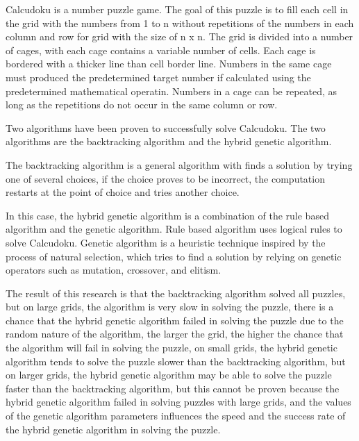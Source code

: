 \abstrakENG
{Calcudoku is a number puzzle game. The goal of this puzzle is to fill each cell in the grid with the numbers from 1 to n without repetitions of the numbers in each column and row for grid with the size of n x n. The grid is divided into a number of cages, with each cage contains a variable number of cells. Each cage is bordered with a thicker line than cell border line. Numbers in the same cage must produced the predetermined target number if calculated using the predetermined mathematical operatin. Numbers in a cage can be repeated, as long as the repetitions do not occur in the same column or row.

Two algorithms have been proven to successfully solve Calcudoku. The two algorithms are the backtracking algorithm and the hybrid genetic algorithm.

The backtracking algorithm is a general algorithm with finds a solution by trying one of several choices, if the choice proves to be incorrect, the computation restarts at the point of choice and tries another choice.

In this case, the hybrid genetic algorithm is a combination of the rule based algorithm and the genetic algorithm. Rule based algorithm uses logical rules to solve Calcudoku. Genetic algorithm is a heuristic technique inspired by the process of natural selection, which tries to find a solution by relying on genetic operators such as mutation, crossover, and elitism.

The result of this research is that the backtracking algorithm solved all puzzles, but on large grids, the algorithm is very slow in solving the puzzle, there is a chance that the hybrid genetic algorithm failed in solving the puzzle due to the random nature of the algorithm, the larger the grid, the higher the chance that the algorithm will fail in solving the puzzle, on small grids, the hybrid genetic algorithm tends to solve the puzzle slower than the backtracking algorithm, but on larger grids, the hybrid genetic algorithm may be able to solve the puzzle faster than the backtracking algorithm, but this cannot be proven because the hybrid genetic algorithm failed in solving puzzles with large grids, and the values of the genetic algorithm parameters influences the speed and the success rate of the hybrid genetic algorithm in solving the puzzle.}


